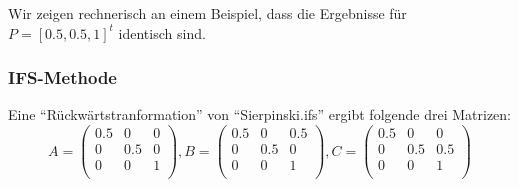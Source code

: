 \documentclass[]{article}
\begin{document}
Wir zeigen rechnerisch an einem Beispiel, dass die Ergebnisse für $P=[0.5,0.5,1]^t$ identisch sind. 

\subsubsection*{IFS-Methode}
Eine "`Rückwärtstranformation"' von "`Sierpinski.ifs"' ergibt folgende drei Matrizen:
 \[  
 A = 
 \begin{pmatrix}
 0.5 & 0 & 0 \\
 0 & 0.5 & 0 \\
 0 & 0 & 1 \\
 \end{pmatrix}
 ,
 B = 
 \begin{pmatrix}
 0.5 & 0 & 0.5 \\
 0 & 0.5 & 0 \\
 0 & 0 & 1 \\
 \end{pmatrix}
,
 C = 
 \begin{pmatrix}
 0.5 & 0 & 0 \\
 0 & 0.5 & 0.5 \\
 0 & 0 & 1 \\
 \end{pmatrix}
 \] 
 
\end{document}
